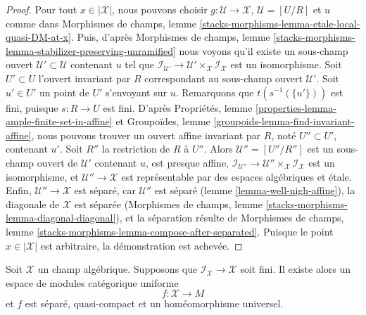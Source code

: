 \begin{proof}
Pour tout $x \in |\mathcal{X}|$, nous pouvons choisir
$g : \mathcal{U} \to \mathcal{X}$, $\mathcal{U} = [U/R]$ et $u$ comme dans
Morphismes de champs,
lemme \ref{stacks-morphisms-lemma-etale-local-quasi-DM-at-x}.
Puis, d'après
Morphismes de champs, lemme
\ref{stacks-morphisms-lemma-stabilizer-preserving-unramified}
nous voyons qu'il existe un sous-champ ouvert
$\mathcal{U}' \subset \mathcal{U}$ contenant $u$
tel que $\mathcal{I}_{\mathcal{U}'} \to
\mathcal{U}' \times_\mathcal{X} \mathcal{I}_\mathcal{X}$
est un isomorphisme.
Soit $U' \subset U$ l'ouvert invariant par $R$ correspondant au
sous-champ ouvert $\mathcal{U}'$.
Soit $u' \in U'$ un point de $U'$ s'envoyant sur $u$.
Remarquons que $t(s^{-1}(\{u'\}))$ est fini, puisque $s : R \to U$ est fini.
D'après Propriétés, lemme \ref{properties-lemma-ample-finite-set-in-affine}
et Groupoïdes, lemme \ref{groupoids-lemma-find-invariant-affine},
nous pouvons trouver un ouvert affine invariant par $R$, noté $U'' \subset U'$,
contenant $u'$. Soit $R''$ la restriction de $R$ à $U''$.
Alors $\mathcal{U}'' = [U''/R'']$ est un sous-champ ouvert de
$\mathcal{U}'$ contenant $u$, est presque affine,
$\mathcal{I}_{\mathcal{U}''} \to
\mathcal{U}'' \times_\mathcal{X} \mathcal{I}_\mathcal{X}$
est un isomorphisme, et $\mathcal{U}'' \to \mathcal{X}$
est représentable par des espaces algébriques et \'etale.
Enfin, $\mathcal{U}'' \to \mathcal{X}$ est séparé, car
$\mathcal{U}''$ est séparé (lemme \ref{lemma-well-nigh-affine}),
la diagonale de $\mathcal{X}$ est séparée
(Morphismes de champs, lemme \ref{stacks-morphisms-lemma-diagonal-diagonal}),
et la séparation résulte de Morphismes de champs, lemme
\ref{stacks-morphisms-lemma-compose-after-separated}.
Puisque le point $x \in |\mathcal{X}|$ est arbitraire, la démonstration est achevée.
\end{proof}

\begin{theorem}
\label{theorem-keel-mori}
Soit $\mathcal{X}$ un champ algébrique. Supposons que
$\mathcal{I}_\mathcal{X} \to \mathcal{X}$ soit fini.
Il existe alors un espace de modules catégorique uniforme
$$
f : \mathcal{X} \longrightarrow M
$$
et $f$ est séparé, quasi-compact et un homéomorphisme universel.
\end{theorem}

